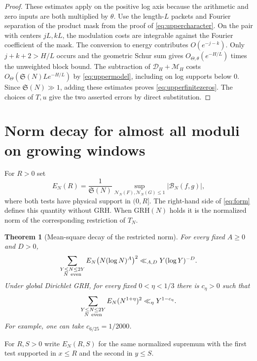\documentclass[11pt,a4paper]{article}
\numberwithin{equation}{section}
\newtheorem{theorem}{Theorem}[section]
\newcommand{\SSS}{\mathfrak S}
\newcommand{\grh}{\mathrm{GRH}}
\newcommand{\B}{\mathcal B_N}
\newcommand{\NN}{\mathcal N_N}
\begin{document}
\begin{proof}
These estimates apply on the positive log axis because
the arithmetic and zero inputs are both multiplied by
$\theta$. Use the length-$L$ packets and Fourier separation
of the product mask from the proof of \cref{eq:uppercharacter}.
On the pair with centers $jL,kL$, the modulation costs are
integrable against the Fourier coefficient of the mask.
The conversion to energy contributes $O(e^{-j-k})$.
Only $j+k+2>H/L$ occurs and the geometric Schur sum gives
$O_{\Theta,\theta}(e^{-H/L})$ times the unweighted block
bound. The subtraction of $\mathcal D_H+\mathcal M_H$
costs $O_\Theta(\SSS(N)L e^{-H/L})$ by
\cref{eq:uppermodel}, including on log supports below $0$.
Since $\SSS(N)\gg1$, adding these estimates proves
\cref{eq:upperfinitezeros}. The choices of $T,u$ give the
two asserted errors by direct substitution.
\end{proof}

\section{Norm decay for almost all moduli on growing windows}
\label{sec:almostall}

For $R>0$ set
\[
 E_N(R)=\frac{1}{\SSS(N)}
     \sup_{\NN(F),\NN(G)\le1}|\B(f,g)|,
\]
where both tests have physical support in $(0,R]$. The right-hand
side of \cref{eq:form} defines this quantity without GRH. When
$\grh(N)$ holds it is the normalized norm of the corresponding
restriction of $T_N$.

\begin{theorem}[Mean-square decay of the restricted norm]
\label{thm:almostall}
For every fixed $A\ge0$ and $D>0$,
\begin{equation}
 \sum_{\substack{Y\le N\le2Y\\N\ {\rm even}}}
      E_N\bigl(N(\log N)^A\bigr)^2
     \ll_{A,D}Y(\log Y)^{-D}.
 \label{eq:almostlog}
\end{equation}
Under global Dirichlet GRH, for every fixed $0<\eta<1/3$
there is $c_\eta>0$ such that
\begin{equation}
 \sum_{\substack{Y\le N\le2Y\\N\ {\rm even}}}
      E_N(N^{1+\eta})^2
     \ll_\eta Y^{1-c_\eta}.
 \label{eq:almostpower}
\end{equation}
For example, one can take $c_{6/25}=1/2000$.
\end{theorem}

For $R,S>0$ write $E_N(R,S)$ for the same normalized supremum
with the first test supported in $x\le R$ and the second in
$y\le S$.
\end{document}
